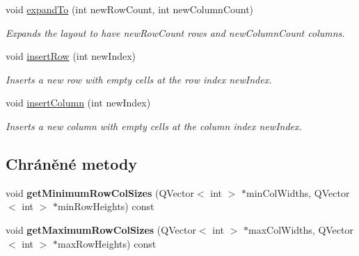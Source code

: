 \begin{DoxyCompactItemize}
void \hyperlink{classQCPLayoutGrid_a886c0dcbabd51a45da399e044552b685}{expand\+To} (int new\+Row\+Count, int new\+Column\+Count)
\begin{DoxyCompactList}\small\item\em Expands the layout to have {\itshape new\+Row\+Count} rows and {\itshape new\+Column\+Count} columns. \end{DoxyCompactList}\item 
void \hyperlink{classQCPLayoutGrid_a48af3dd7c3a653d9c3d7dd99bd02e838}{insert\+Row} (int new\+Index)
\begin{DoxyCompactList}\small\item\em Inserts a new row with empty cells at the row index {\itshape new\+Index}. \end{DoxyCompactList}\item 
void \hyperlink{classQCPLayoutGrid_a1e880a321dbe8b43b471ccd764433dc4}{insert\+Column} (int new\+Index)
\begin{DoxyCompactList}\small\item\em Inserts a new column with empty cells at the column index {\itshape new\+Index}. \end{DoxyCompactList}\end{DoxyCompactItemize}
\subsection*{Chráněné metody}
\begin{DoxyCompactItemize}
\item 
\hypertarget{classQCPLayoutGrid_ac645fb9b1c4257b08a9f09dee10b9b3f}{}void {\bfseries get\+Minimum\+Row\+Col\+Sizes} (Q\+Vector$<$ int $>$ $\ast$min\+Col\+Widths, Q\+Vector$<$ int $>$ $\ast$min\+Row\+Heights) const \label{classQCPLayoutGrid_ac645fb9b1c4257b08a9f09dee10b9b3f}

\item 
\hypertarget{classQCPLayoutGrid_af348d903e3b8bc416f1fe1b8125d1173}{}void {\bfseries get\+Maximum\+Row\+Col\+Sizes} (Q\+Vector$<$ int $>$ $\ast$max\+Col\+Widths, Q\+Vector$<$ int $>$ $\ast$max\+Row\+Heights) const \label{classQCPLayoutGrid_af348d903e3b8bc416f1fe1b8125d1173}

\end{DoxyCompactItemize}
